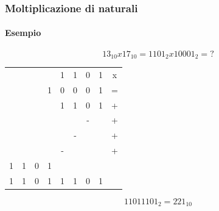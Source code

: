 \documentclass{beamer}
\begin{document}
		\begin{frame}
	    \frametitle{Moltiplicazione di naturali}
	    \framesubtitle{Esempio}
			
			$$13_{10} x 17_{10} = 1101_{2} x 10001_{2} = \text{?}$$
	    \vspace{1em}
	    \pause	    
	    \begin{center}
	    \begin{tabular}{cccccccc||c}
	      &   &   &   & 1 & 1 & 0 & 1 & x \\ 
	      &   &   & 1 & 0 & 0 & 0 & 1 & = \\ 
	    \hline 
	      &   &   &   & 1 & 1 & 0 & 1 &  + \\ 
	      &   &   &   &   &   & - &   &  + \\ 
	      &   &   &   &   & - &   &   &  + \\ 
	      &   &   &   & - &   &   &   &  + \\ 
	    1 & 1 & 0 & 1 &   &   &   &   &   \\ 
	    \hline 
	    1 & 1 & 0 & 1 & 1 & 1 & 0 & 1 &   \\ 
	    \end{tabular} 
	    \end{center}
	    
	    \pause
			\vspace{1em}
			$$11011101_{2} = 221_{10}$$
	  \end{frame}
\end{document}
